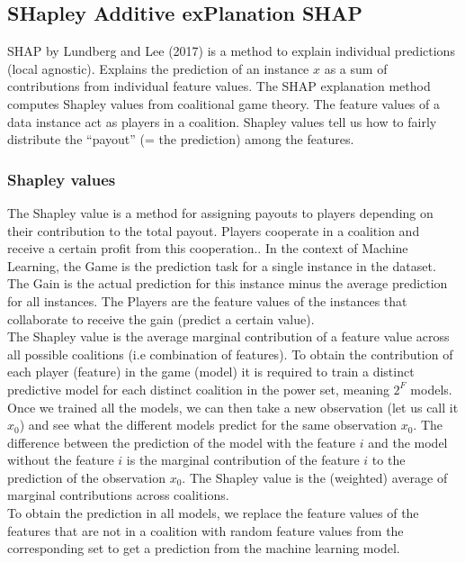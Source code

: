 \subsection{SHapley Additive exPlanation \- SHAP}
SHAP by Lundberg and Lee (2017)\cite{Lundberg2017} is a method to explain individual predictions (local agnostic).
Explains the prediction of an instance $x$ as a sum of contributions from individual feature values.
The SHAP explanation method computes Shapley values from coalitional game theory. The feature values of a data instance act as players in a coalition. Shapley values tell us how to fairly distribute the “payout” (= the prediction) among the features.
\subsubsection{Shapley values}
The Shapley value is a method for assigning payouts to players depending on their contribution to the total payout. Players cooperate in a coalition and receive a certain profit from this cooperation..
In the context of Machine Learning, the Game is the prediction task for a single instance in the dataset. The Gain is the actual prediction for this instance minus the average prediction for all instances. The Players are the feature values of the instances that collaborate to receive the gain (predict a certain value).\\

The Shapley value is the average marginal contribution of a feature value across all possible coalitions (i.e combination of features).
To obtain the contribution of each player (feature) in the game (model) it is required to train a distinct predictive model for each distinct coalition in the power set, meaning $2^F$ models.
Once we trained all the models, we can then take a new observation (let us call it $x_0$) and see what the different models predict for the same observation $x_0$.
The difference between the prediction of the model with the feature $i$ and the model without the feature $i$ is the marginal contribution of the feature $i$ to the prediction of the observation $x_0$.
The Shapley value is the (weighted) average of marginal contributions across coalitions.\\

To obtain the prediction in all models, we replace the feature values of the features that are not in a coalition with random feature values from the corresponding set to get a prediction from the machine learning model.

